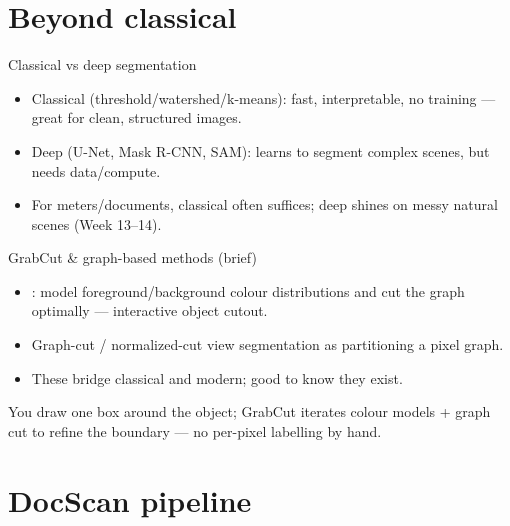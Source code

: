 \documentclass[10pt,aspectratio=169]{beamer}
\begin{document}
\section{Beyond classical}

\begin{frame}{Classical vs deep segmentation}
  \begin{itemize}
    \item Classical (threshold/watershed/k-means): fast, interpretable, no training --- great for clean, structured images.
    \item Deep (U-Net, Mask R-CNN, SAM): learns to segment complex scenes, but needs data/compute.
    \item For meters/documents, classical often suffices; deep shines on messy natural scenes (Week 13--14).
  \end{itemize}
\end{frame}

\begin{frame}{GrabCut \& graph-based methods (brief)}
  \begin{itemize}
    \item {}: model foreground/background colour distributions and cut the graph optimally --- interactive object cutout.
    \item Graph-cut / normalized-cut view segmentation as partitioning a pixel graph.
    \item These bridge classical and modern; good to know they exist.
  \end{itemize}
  \begin{infobox}
    You draw one box around the object; GrabCut iterates colour models + graph cut to
    refine the boundary --- no per-pixel labelling by hand.
  \end{infobox}
\end{frame}

\section{DocScan pipeline}
\end{document}
